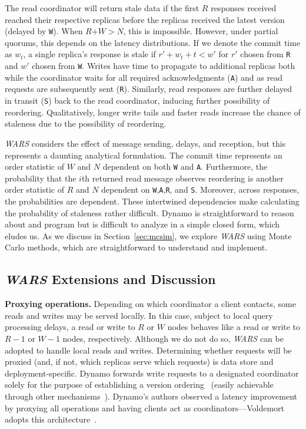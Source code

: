 \documentclass{vldb}
\newcommand{\subsectionskip}{-0em}
\begin{document}
The read coordinator will return stale data if the first $R$ responses
received reached their respective replicas before the replicas
received the latest version (delayed by \texttt{W}).  When
$R$$+$$W$$>$$N$, this is impossible.  However, under partial quorums,
this depends on the latency distributions.  If we denote the commit
time as $w_t$, a single replica's response is stale if $r'+w_t+t< w'$
for $r'$ chosen from \texttt{R} and $w'$ chosen from \texttt{W}.
Writes have time to propagate to additional replicas both while the
coordinator waits for all required acknowledgments (\texttt{A}) and as
read requests are subsequently sent (\texttt{R}).  Similarly, read
responses are further delayed in transit (\texttt{S}) back to the read
coordinator, inducing further possibility of reordering.
Qualitatively, longer write tails and faster reads increase the chance
of staleness due to the possibility of reordering.

\textit{WARS} considers the effect of message sending, delays, and
reception, but this represents a daunting analytical formulation.  The
commit time represents an order statistic of $W$ and $N$ dependent on
both \texttt{W} and \texttt{A}.  Furthermore, the probability that the
$i$th returned read message observes reordering is another order
statistic of $R$ and $N$ dependent on
\texttt{W},\texttt{A},\texttt{R}, and \texttt{S}.  Moreover, across
responses, the probabilities are dependent. These intertwined
dependencies make calculating the probability of staleness rather
difficult.  Dynamo is straightforward to reason about and program but
is difficult to analyze in a simple closed form, which eludes us.  As
we discuss in Section~\ref{sec:mcsim}, we explore \textit{WARS} using
Monte Carlo methods, which are straightforward to understand and
implement.

\vspace{\subsectionskip}\subsection{{\large \textit{WARS}} Extensions and Discussion}
\label{sec:anti-entropy}

\textbf{Proxying operations.} Depending on which coordinator a client
contacts, some reads and writes may be served locally.  In this case,
subject to local query processing delays, a read or write to $R$ or
$W$ nodes behaves like a read or write to $R-1$ or $W-1$ nodes,
respectively.  Although we do not do so, \textit{WARS} can be adopted
to handle local reads and writes.  Determining whether requests will
be proxied (and, if not, which replicas serve which requests) is data
store and deployment-specific.  Dynamo forwards write requests to a
designated coordinator solely for the purpose of establishing a
version ordering~\cite[Section 6.4]{dynamo} (easily achievable through
other mechanisms~\cite{zookeeper}).  Dynamo's authors observed a
latency improvement by proxying all operations and having clients act
as coordinators---Voldemort adopts this
architecture~\cite{voldemortclient}.
\end{document}
